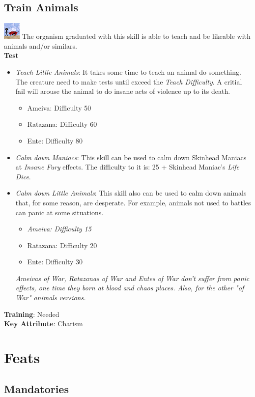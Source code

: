 \documentclass[ letterpaper,12pt]{article}
\begin{document}
\subsection{Train Animals}
\includegraphics{../data/skills/Img/adestrar.png}
The organism graduated with this skill is able to teach and be likeable with
animals and/or similars.\\
{\bf Test}
\begin{itemize}
\item{{\it Teach Little Animals}: It takes some time to teach an animal do something.
The creature need to make tests until exceed the {\it Teach Difficulty}. A
critial fail will arouse the animal to do insane acts of violence up to its
death.}
\begin{itemize}
\item{Ameiva: Difficulty 50}
\item{Ratazana: Difficulty 60}
\item{Ente: Difficulty 80}
\end{itemize}
\item{{\it Calm down Maniacs}: This skill can be used to calm down Skinhead Maniacs at {\it Insane Fury} effects. The difficulty to it is: 25 + Skinhead Maniac's {\it Life Dice}.}
\item{{\it Calm down Little Animals}: This skill also can be used to calm down animals that, for some reason, are desperate. For example, animals not used to battles can panic at some situations.}
\begin{itemize}
\item{\it Ameiva: Difficulty 15}
\item{Ratazana: Difficulty 20}
\item{Ente: Difficulty 30}
\end{itemize}
{\it *Ameivas of War, Ratazanas of War and Entes of War don't suffer from panic effects, one time they born at blood and chaos places. Also, for the other "of War" animals versions.}
\end{itemize}
{\bf Training}: Needed\\
{\bf Key Attribute}: Charism

\section{Feats}

\subsection{Mandatories}
\end{document}
